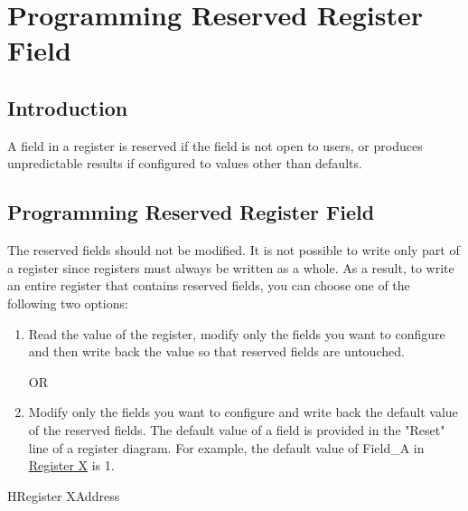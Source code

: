 \section*{Programming Reserved Register Field}\label{programming-reserved-field}
\rhead{\Navigation}

\subsection*{Introduction}

A field in a register is reserved if the field is not open to users, or produces unpredictable results if configured to values other than defaults.

\subsection*{Programming Reserved Register Field}

The reserved fields should not be modified. It is not possible to write only part of a register since registers must always be written as a whole. As a result, to write an entire register that contains reserved fields, you can choose one of the following two options:

\begin{enumerate}
    \item Read the value of the register, modify only the fields you want to configure and then write back the value so that reserved fields are untouched.

\noindent OR

\item Modify only the fields you want to configure and write back the default value of the reserved fields. The default value of a field is provided in the "Reset" line of a register diagram. For example, the default value of Field\_A in \hyperref[fig:registerX]{Register X} is 1.
\end{enumerate}

\begin{register}{H}{Register X}{Address}\label{fig:registerX}
%
%
%
%
%
\regnewline%

\end{register}

